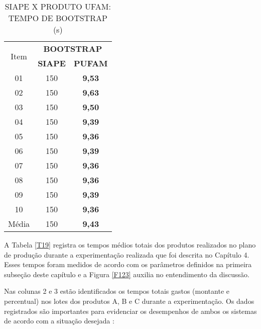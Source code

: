 \begin{table}[!h]
	\centering
	\caption{SIAPE X PRODUTO UFAM: TEMPO DE BOOTSTRAP (s)}
	\begin{tabular}{c | c  c } \hline
		\multirow{2}{*}{Item} & \multicolumn{2}{c}{\textbf{BOOTSTRAP}} \\ \cline{2-3}
								  & \textbf{SIAPE} & \textbf{PUFAM}       \\ \hline
		\hline
		01 & 150 &  \textbf{9,53}  \\ \hline
		02 & 150 &  \textbf{9,63}  \\ \hline
		03 & 150 &  \textbf{9,50}  \\ \hline
		04 & 150 &  \textbf{9,39}  \\ \hline
		05 & 150 &  \textbf{9,36}  \\ \hline
		06 & 150 &  \textbf{9,39}  \\ \hline
		07 & 150 &  \textbf{9,36}  \\ \hline
		08 & 150 &  \textbf{9,36}  \\ \hline
		09 & 150 &  \textbf{9,39}  \\ \hline
		10 & 150 &  \textbf{9,36}  \\ \hline
		\hline
			             
		Média & 150 & \textbf{9,43}  \\ \hline
		
	\end{tabular}												
	\label{T18}\par
\end{table}
 	
A Tabela \ref{T19} registra os tempos médios totais dos produtos realizados no plano de produção durante a experimentação realizada que foi descrita no Capítulo 4. Esses tempos foram medidos de acordo com os parâmetros definidos na primeira subseção deste capítulo e a Figura \ref{F123} auxilia no entendimento da discussão. \par 

Nas colunas 2 e 3 estão identificados os tempos totais gastos (montante e percentual) nos lotes dos produtos A, B e C durante a experimentação. Os dados registrados são importantes para evidenciar os desempenhos de ambos os sistemas de acordo com a situação desejada : \par 

